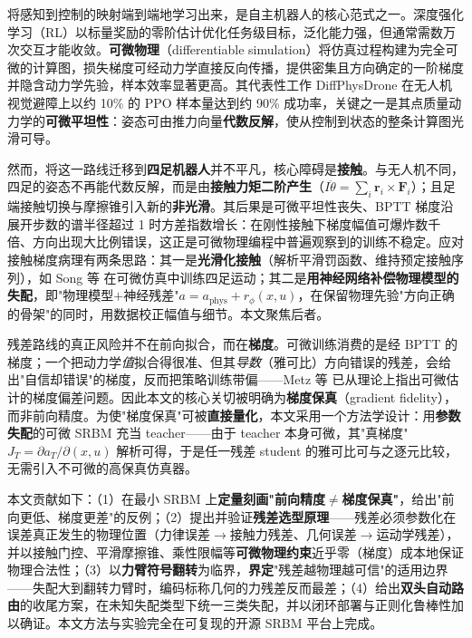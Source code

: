 \documentclass[zihao=5, a4paper]{ctexart}
\begin{document}
将感知到控制的映射端到端地学习出来，是自主机器人的核心范式之一。深度强化学习（RL）以标量奖励的零阶估计优化任务级目标，泛化能力强，但通常需数万次交互才能收敛\cite{ref8,ref11}。\textbf{可微物理}（differentiable simulation）将仿真过程构建为完全可微的计算图，损失梯度可经动力学直接反向传播，提供密集且方向确定的一阶梯度并隐含动力学先验，样本效率显著更高\cite{ref13}。其代表性工作 DiffPhysDrone\cite{ref14} 在无人机视觉避障上以约 10\% 的 PPO 样本量达到约 90\% 成功率，关键之一是其点质量动力学的\textbf{可微平坦性}：姿态可由推力向量\textbf{代数反解}，使从控制到状态的整条计算图光滑可导。

然而，将这一路线迁移到\textbf{四足机器人}并不平凡，核心障碍是\textbf{接触}。与无人机不同，四足的姿态不再能代数反解，而是由\textbf{接触力矩二阶产生}（$I\ddot\theta=\sum_i \bm r_i\times\bm F_i$）；且足端接触切换与摩擦锥引入新的\textbf{非光滑}。其后果是可微平坦性丧失、BPTT 梯度沿展开步数的谱半径超过 1 时方差指数增长\cite{ref12}：在刚性接触下梯度幅值可爆炸数千倍、方向出现大比例错误，这正是可微物理编程中普遍观察到的训练不稳定\cite{ref29}。应对接触梯度病理有两条思路：其一是\textbf{光滑化接触}（解析平滑罚函数、维持预定接触序列），如 Song 等\cite{ref13} 在可微仿真中训练四足运动；其二是\textbf{用神经网络补偿物理模型的失配}，即"物理模型$+$神经残差"$a=a_{\text{phys}}+r_\phi(x,u)$，在保留物理先验"方向正确的骨架"的同时，用数据校正幅值与细节。本文聚焦后者。

残差路线的真正风险并不在前向拟合，而在\textbf{梯度}。可微训练消费的是经 BPTT 的梯度；一个把动力学\emph{值}拟合得很准、但其\emph{导数}（雅可比）方向错误的残差，会给出"自信却错误"的梯度，反而把策略训练带偏——Metz 等\cite{ref12} 已从理论上指出可微估计的梯度偏差问题。因此本文的核心关切被明确为\textbf{梯度保真}（gradient fidelity），而非前向精度。为使"梯度保真"可被\textbf{直接量化}，本文采用一个方法学设计：用\textbf{参数失配}的可微 SRBM 充当 teacher——由于 teacher 本身可微，其"真梯度"$J_T=\partial a_T/\partial(x,u)$ 解析可得，于是任一残差 student 的雅可比可与之逐元比较，无需引入不可微的高保真仿真器。

本文贡献如下：（1）在最小 SRBM 上\textbf{定量刻画"前向精度$\neq$梯度保真"}，给出"前向更低、梯度更差"的反例；（2）提出并验证\textbf{残差选型原理}——残差必须参数化在误差真正发生的物理位置（力律误差$\to$接触力残差、几何误差$\to$运动学残差），并以接触门控、平滑摩擦锥、乘性限幅等\textbf{可微物理约束}近乎零（梯度）成本地保证物理合法性；（3）以\textbf{力臂符号翻转}为临界，\textbf{界定}"残差越物理越可信"的适用边界——失配大到翻转力臂时，编码标称几何的力残差反而最差；（4）给出\textbf{双头自动路由}的收尾方案，在未知失配类型下统一三类失配，并以闭环部署与正则化鲁棒性加以确证。本文方法与实验完全在可复现的开源 SRBM 平台上完成。
\end{document}
